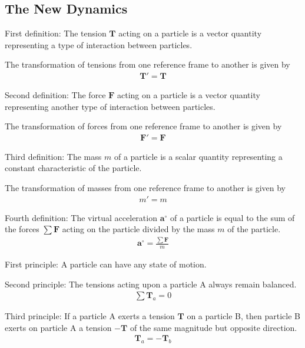 \documentclass[11pt]{article}
\newcommand{\vA}{\mathbf{a}}
\newcommand{\vF}{\mathbf{F}}
\newcommand{\vT}{\mathbf{T}}
\newcommand{\mM}{m}
\newcommand{\rt}{'}
\newcommand{\ra}{_a}
\newcommand{\rb}{_b}
\begin{document}
\newpage

{\centering\subsection*{The New Dynamics}}

\par First definition: The tension $\vT$ acting on a particle is a vector quantity representing a type of interaction between particles.
\par The transformation of tensions from one reference frame to another is given by
\begin{eqnarray*}
\vT\rt = \vT
\end{eqnarray*}
\par Second definition: The force $\vF$ acting on a particle is a vector quantity representing another type of interaction between particles.
\par The transformation of forces from one reference frame to another is given by
\begin{eqnarray*}
\vF\rt = \vF
\end{eqnarray*}
\par Third definition: The mass $\mM$ of a particle is a scalar quantity representing a constant characteristic of the particle.
\par The transformation of masses from one reference frame to another is given by
\begin{eqnarray*}
\mM\rt = \mM
\end{eqnarray*}
\par Fourth definition: The virtual acceleration $\vA^{\circ}$ of a particle is equal to the sum of the forces $\sum \vF$ acting on the particle divided by the mass $\mM$ of the particle.
\begin{eqnarray*}
\vA^{\circ} = \frac{\sum \vF}{\mM}
\end{eqnarray*}
\par First principle: A particle can have any state of motion.
\par Second principle: The tensions acting upon a particle A always remain balanced.
\begin{eqnarray*}
\sum \vT\ra = 0
\end{eqnarray*}
\par Third principle: If a particle A exerts a tension $\vT$ on a particle B, then particle B exerts on particle A a tension $-\vT$ of the same magnitude but opposite direction.
\begin{eqnarray*}
\vT\ra = -\vT\rb
\end{eqnarray*}
\end{document}
